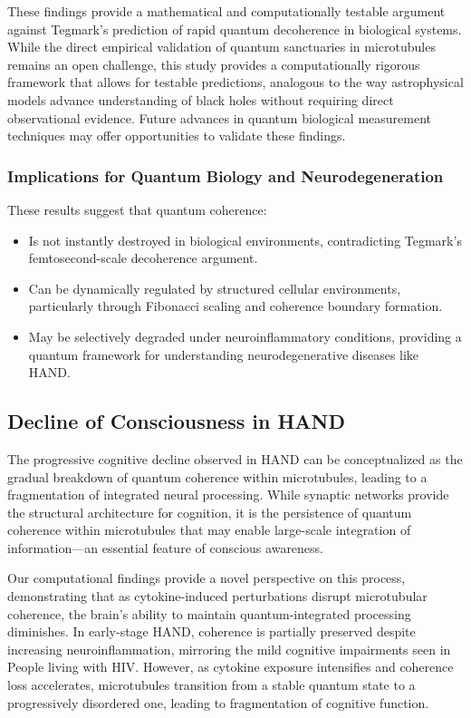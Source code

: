 \documentclass[entropy,article,submit,oneauthor,pdftex]{Definitions/mdpi}
\begin{document}
These findings provide a mathematical and computationally testable argument against Tegmark's prediction of rapid quantum decoherence in biological systems. While the direct empirical validation of quantum sanctuaries in microtubules remains an open challenge, this study provides a computationally rigorous framework that allows for testable predictions, analogous to the way astrophysical models advance understanding of black holes without requiring direct observational evidence. Future advances in quantum biological measurement techniques may offer opportunities to validate these findings.

\subsubsection{Implications for Quantum Biology and Neurodegeneration}
These results suggest that quantum coherence:
\begin{itemize}
    \item Is not instantly destroyed in biological environments, contradicting Tegmark's femtosecond-scale decoherence argument.
    \item Can be dynamically regulated by structured cellular environments, particularly through Fibonacci scaling and coherence boundary formation.
    \item May be selectively degraded under neuroinflammatory conditions, providing a quantum framework for understanding neurodegenerative diseases like HAND.
\end{itemize}

\subsection{Decline of Consciousness in HAND}
The progressive cognitive decline observed in HAND can be conceptualized as the gradual breakdown of quantum coherence within microtubules, leading to a fragmentation of integrated neural processing. While synaptic networks provide the structural architecture for cognition, it is the persistence of quantum coherence within microtubules that may enable large-scale integration of information—an essential feature of conscious awareness. 

Our computational findings provide a novel perspective on this process, demonstrating that as cytokine-induced perturbations disrupt microtubular coherence, the brain's ability to maintain quantum-integrated processing diminishes. In early-stage HAND, coherence is partially preserved despite increasing neuroinflammation, mirroring the mild cognitive impairments seen in People living with HIV. However, as cytokine exposure intensifies and coherence loss accelerates, microtubules transition from a stable quantum state to a progressively disordered one, leading to fragmentation of cognitive function.
\end{document}
